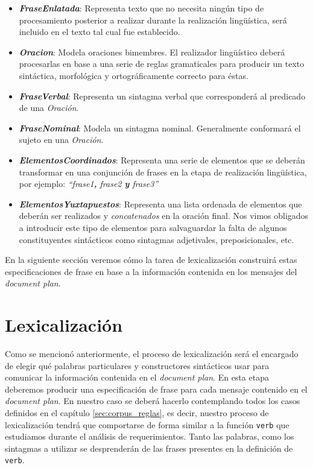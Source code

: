 \medskip
\begin{itemize}
\item{\emph{\textbf{FraseEnlatada}}: Representa texto que no necesita ningún tipo de procesamiento posterior a realizar durante la realización lingüística, será incluido en el texto tal cual fue establecido.}
\item{\emph{\textbf{Oracion}}: Modela oraciones bimembres. El realizador lingüístico deberá procesarlas en base a una serie de reglas gramaticales para producir un texto sintáctica, morfológica y ortográficamente correcto para éstas.}
\item{\emph{\textbf{FraseVerbal}}: Representa un sintagma verbal que corresponderá al predicado de una \emph{Oración}.}
\item{\emph{\textbf{FraseNominal}}: Modela un sintagma nominal. Generalmente conformará el sujeto en una \emph{Oración}.}
\item{\emph{\textbf{ElementosCoordinados}}: Representa una serie de elementos que se deberán transformar en una conjunción de frases en la etapa de realización lingüística, por ejemplo: \emph{``frase1\textbf{,} frase2 \textbf{y} frase3''}}
\item{\emph{\textbf{ElementosYuxtapuestos}}: Representa una lista ordenada de elementos que deberán ser realizados y \emph{concatenados} en la oración final. Nos vimos obligados a introducir este tipo de elementos para salvaguardar la falta de algunos constituyentes sintácticos como sintagmas adjetivales, preposicionales, etc.}
\end{itemize}

\bigskip
En la siguiente sección veremos cómo la tarea de lexicalización construirá estas especificaciones de frase en base a la información contenida en los mensajes del \textit{document plan}.

\section{Lexicalización}
\label{sec:microplanning_lexicalization}

Como se mencionó anteriormente, el proceso de lexicalización será el encargado de elegir qué palabras particulares y constructores sintácticos usar para comunicar la información contenida en el \textit{document plan}. En esta etapa deberemos producir una especificación de frase para cada mensaje contenido en el \textit{document plan}. En nuestro caso se deberá hacerlo contemplando todos los casos definidos en el capítulo \ref{sec:corpus_reglas}, es decir, nuestro proceso de lexicalización tendrá que comportarse de forma similar a la función \texttt{verb} que estudiamos durante el análisis de requerimientos. Tanto las palabras, como los sintagmas a utilizar se desprenderán de las frases presentes en la definición de \texttt{verb}.

